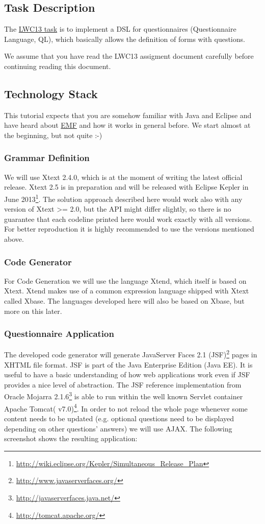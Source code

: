 \subsection{Task Description}
The {\href{http://www.languageworkbenches.net/images/5/53/Ql.pdf}{LWC13 task}}
is to implement a DSL for questionnaires (Questionnaire Language, QL), which
basically allows the definition of forms with questions.

We assume that you have read the LWC13 assigment document carefully before
continuing reading this document.


\subsection{Technology Stack}
\label{subsec:technologyStack}
This tutorial expects that you are somehow familiar with Java and Eclipse and
have heard about \url{EMF} and how it works in general before. We start almost at the
beginning, but not quite :-) 

\subsubsection*{Grammar Definition}
We will use Xtext 2.4.0, which is at the moment of writing the latest official
release.
Xtext 2.5 is in preparation and will be released with Eclipse Kepler in June
2013\footnote{\url{http://wiki.eclipse.org/Kepler/Simultaneous_Release_Plan}}.
The solution approach described here would work also with any version
of Xtext >= 2.0, but the API might differ slightly, so there is no guarantee
that each codeline printed here would work exactly with all versions. For better
reproduction it is highly recommended to use the versions mentioned above.

\subsubsection*{Code Generator}
For Code Generation we will use the language Xtend, which itself is based on
Xtext. Xtend makes use of a common expression language shipped with Xtext called
Xbase. The languages developed here will also be based on Xbase, but more on
this later.

\subsubsection*{Questionnaire Application}
The developed code generator will generate
JavaServer Faces 2.1 (JSF)\footnote{\url{http://www.javaserverfaces.org/}} pages
in XHTML file format. JSF is part of the Java Enterprise Edition (Java EE). It
is useful to have a basic understanding of how web applications work even if JSF provides a nice level 
of abstraction. The JSF reference implementation from 
Oracle Mojarra 2.1.6\footnote{\url{http://javaserverfaces.java.net/}} is able to run 
within the well known Servlet container Apache Tomcat(
v7.0)\footnote{\url{http://tomcat.apache.org/}}. In order to not reload the
whole page whenever some content needs to be updated (e.g. optional questions
need to be displayed depending on other questions' answers) we will use AJAX.
The following screenshot shows the resulting application:


